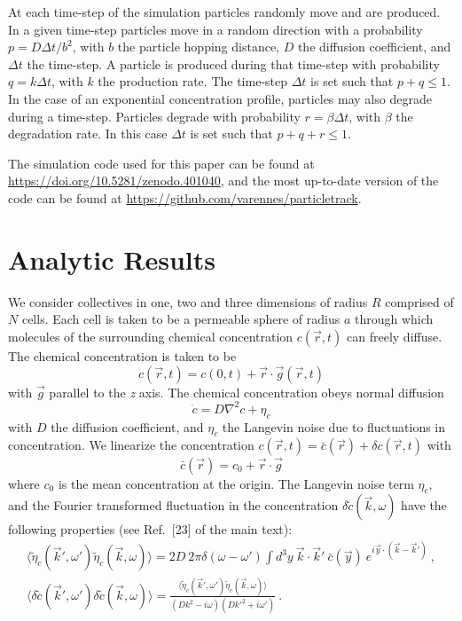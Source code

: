 At each time-step of the simulation particles randomly move and are produced. In a given time-step particles move in a random direction with a probability
$p = D\Delta t/b^2$,
with $b$ the particle hopping distance, $D$ the diffusion coefficient, and $\Delta t$ the time-step. A particle is produced during that time-step with probability
$q = k\Delta t$,
with $k$ the production rate. The time-step $\Delta t$ is set such that $p + q \leq 1$. In the case of an exponential concentration profile, particles may also degrade during a time-step. Particles degrade with probability
$r = \beta \Delta t$, with $\beta$ the degradation rate. In this case $\Delta t$ is set such that $p + q + r \leq 1$.

The simulation code used for this paper can be found at \url{https://doi.org/10.5281/zenodo.401040}, and the most up-to-date version of the code can be found at \url{https://github.com/varennes/particletrack}.


\section{Analytic Results}

We consider collectives in one, two and three dimensions of radius $R$ comprised of $N$ cells. Each cell is taken to be a permeable sphere of radius $a$ through which molecules of the surrounding chemical concentration $c(\vec{r},t)$ can freely diffuse. The chemical concentration is taken to be
\begin{equation}
    c(\vec{r},t) = c(0,t) + \vec{r}\cdot\vec{g}(\vec{r},t)
\end{equation}
with $\vec{g}$ parallel to the \textit{z} axis. The chemical concentration obeys normal diffusion
\begin{equation} \label{eq:diffeq}
    \dot{c} = D\nabla^2c+\eta_c
\end{equation}
with $D$ the diffusion coefficient, and $\eta_c$ the Langevin noise due to fluctuations in concentration. We linearize the concentration $c(\vec{r},t) = \bar{c}(\vec{r}) + \delta c(\vec{r},t)$ with
\begin{equation} \label{eq:meanc}
    \bar{c}(\vec{r}) = c_0 + \vec{r}\cdot\vec{g}
\end{equation}
where $c_0$ is the mean concentration at the origin. The Langevin noise term $\eta_c$, and the Fourier transformed fluctuation in the concentration $\delta\tilde{c}(\vec{k},\omega)$ have the following properties (see Ref.\ [23] of the main text):
\begin{gather}
    \langle\tilde{\eta}_c(\vec{k}',\omega')\tilde{\eta}_c(\vec{k},\omega) \rangle = 2D \ 2\pi\delta(\omega-\omega') \int d^3y \ \vec{k}\cdot\vec{k}' \ \bar{c}(\vec{y}) \ e^{i\vec{y}\cdot\left(\vec{k}-\vec{k}'\right)} \ ,
    \label{eq:c1} \\
    \langle\delta\tilde{c}(\vec{k}',\omega')\delta\tilde{c}(\vec{k},\omega) \rangle = \frac{\langle\tilde{\eta}_c(\vec{k}',\omega')\tilde{\eta}_c(\vec{k},\omega) \rangle}{(Dk^2-i\omega)(Dk'^2+i\omega')} \ .
    \label{eq:c2}
\end{gather}


